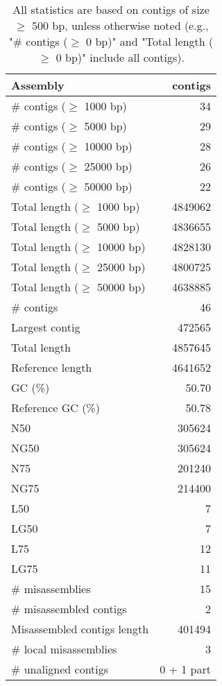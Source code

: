 \documentclass[12pt,a4paper]{article}
\begin{document}
\begin{table}[ht]
\begin{center}
\caption{All statistics are based on contigs of size $\geq$ 500 bp, unless otherwise noted (e.g., "\# contigs ($\geq$ 0 bp)" and "Total length ($\geq$ 0 bp)" include all contigs).}
\begin{tabular}{|l*{1}{|r}|}
\hline
Assembly & contigs \\ \hline
\# contigs ($\geq$ 1000 bp) & 34 \\ \hline
\# contigs ($\geq$ 5000 bp) & 29 \\ \hline
\# contigs ($\geq$ 10000 bp) & 28 \\ \hline
\# contigs ($\geq$ 25000 bp) & 26 \\ \hline
\# contigs ($\geq$ 50000 bp) & 22 \\ \hline
Total length ($\geq$ 1000 bp) & 4849062 \\ \hline
Total length ($\geq$ 5000 bp) & 4836655 \\ \hline
Total length ($\geq$ 10000 bp) & 4828130 \\ \hline
Total length ($\geq$ 25000 bp) & 4800725 \\ \hline
Total length ($\geq$ 50000 bp) & 4638885 \\ \hline
\# contigs & 46 \\ \hline
Largest contig & 472565 \\ \hline
Total length & 4857645 \\ \hline
Reference length & 4641652 \\ \hline
GC (\%) & 50.70 \\ \hline
Reference GC (\%) & 50.78 \\ \hline
N50 & 305624 \\ \hline
NG50 & 305624 \\ \hline
N75 & 201240 \\ \hline
NG75 & 214400 \\ \hline
L50 & 7 \\ \hline
LG50 & 7 \\ \hline
L75 & 12 \\ \hline
LG75 & 11 \\ \hline
\# misassemblies & 15 \\ \hline
\# misassembled contigs & 2 \\ \hline
Misassembled contigs length & 401494 \\ \hline
\# local misassemblies & 3 \\ \hline
\# unaligned contigs & 0 + 1 part \\ \hline

\end{tabular}
\end{center}
\end{table}
\end{document}
